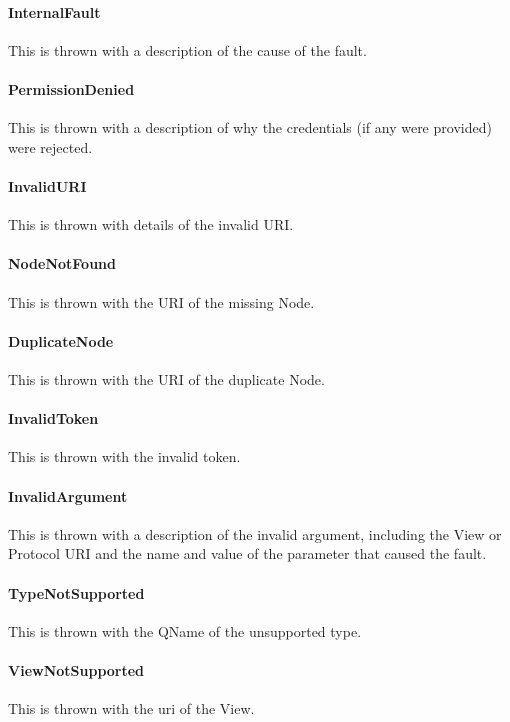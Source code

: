 \documentclass[11pt,a4paper]{ivoa}
\begin{document}
\paragraph{InternalFault}
This is thrown with a description of the cause of the fault.

\paragraph{PermissionDenied}
This is thrown with a description of why the credentials (if any were provided) were rejected.

\paragraph{InvalidURI}
This is thrown with details of the invalid URI.

\paragraph{NodeNotFound}
This is thrown with the URI of the missing Node.

\paragraph{DuplicateNode}
This is thrown with the URI of the duplicate Node.

\paragraph{InvalidToken}
This is thrown with the invalid token.

\paragraph{InvalidArgument}
This is thrown with a description of the invalid argument, including the View or Protocol URI and the name and value of the parameter that caused the fault.

\paragraph{TypeNotSupported}
This is thrown with the QName of the unsupported type.

\paragraph{ViewNotSupported}
This is thrown with the uri of the View.
\end{document}
